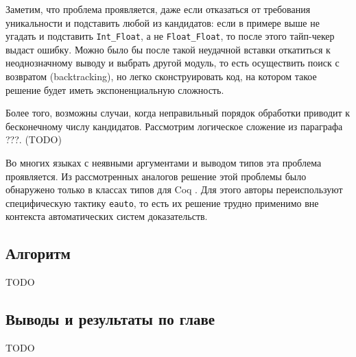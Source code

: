 \documentclass[../diploma.tex]{subfiles}
\begin{document}
Заметим, что проблема проявляется, даже если отказаться от требования уникальности и подставить любой из кандидатов: если в примере выше не угадать и подставить \texttt{Int_Float}, а не \texttt{Float_Float}, то после этого тайп-чекер выдаст ошибку. Можно было бы после такой неудачной вставки откатиться к неоднозначному выводу и выбрать другой модуль, то есть осуществить поиск с возвратом (backtracking), но легко сконструировать код, на котором такое решение будет иметь экспоненциальную сложность.

Более того, возможны случаи, когда неправильный порядок обработки приводит к бесконечному числу кандидатов. Рассмотрим логическое сложение из параграфа ???. (TODO)

Во многих языках с неявными аргументами и выводом типов эта проблема проявляется. Из рассмотренных аналогов решение этой проблемы было обнаружено только в классах типов для Coq \cite{coq_typeclasses}. Для этого авторы переиспользуют специфическую тактику \texttt{eauto}, то есть их решение трудно применимо вне контекста автоматических систем доказательств.

\subsection{Алгоритм}

TODO

\subsection{Выводы и результаты по главе}

TODO
\end{document}
